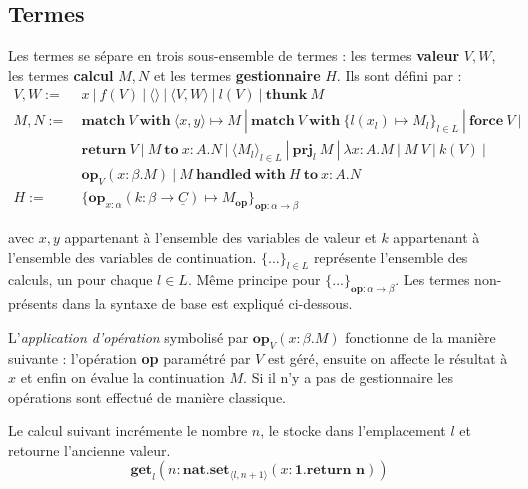 \subsection{Termes}

	Les termes se sépare en trois sous-ensemble de termes : les termes \textbf{valeur} $V,W$, les termes \textbf{calcul} $M,N$ et les termes \textbf{gestionnaire} $H$. Ils sont défini par :
	\begin{align*}
		V,W :=&~x~|~f(V)~|~\langle\rangle~|~\langle V,W\rangle~|~l(V)~|~\textbf{thunk}~M\\
		M,N :=&~\textbf{match}~V~\textbf{with}~\langle x,y\rangle  \mapsto M~|~\textbf{match}~V~\textbf{with}~\{l(x_l)  \mapsto M_l\}_{l \in L}~|~\textbf{force}~V~|\\
		&~\textbf{return}~V~|~M~\textbf{to}~x:A.N~|~\langle M_l\rangle_{l \in L}~|~\textbf{prj}_l~M~|~\lambda x:A.M~|~M~V~|~k(V)~|\\
		&~\textbf{op}_V(x:\beta .M)~|~M~\textbf{handled}~\textbf{with}~H~\textbf{to}~x:A.N\\
		H :=&~\{\textbf{op}_{x:\alpha}(k:\beta \rightarrow \underline{C}) \mapsto M_\textbf{op} \}_{\textbf{op}:\alpha \rightarrow \beta}
	\end{align*}
	
	avec $x,y$ appartenant à l'ensemble des variables de valeur et $k$ appartenant à l'ensemble des variables de continuation. $\{...\}_{l \in L}$ représente l'ensemble des calculs, un pour chaque $l \in L$. Même principe pour $\{...\}_{\textbf{op} : \alpha \rightarrow \beta}$. Les termes non-présents dans la syntaxe de base est expliqué ci-dessous. 

	\bigbreak
	L'\textit{application d'opération} symbolisé par $\textbf{op}_V(x:\beta .M)$ fonctionne de la manière suivante : l'opération \textbf{op} paramétré par $V$ est géré, ensuite on affecte le résultat à $x$ et enfin on évalue la continuation $M$. Si il n'y a pas de gestionnaire les opérations sont effectué de manière classique.
		
	

	\begin{exemple}\label{get1}
		Le calcul suivant incrémente le nombre $n$, le stocke dans l'emplacement $l$ et retourne l'ancienne valeur.
		\[\textbf{get}_l(n:\textbf{nat}.\textbf{set}_{\langle l,n+1\rangle}(x:\textbf{1}.\textbf{return~n}))\]
	\end{exemple}
	\bigbreak
	
